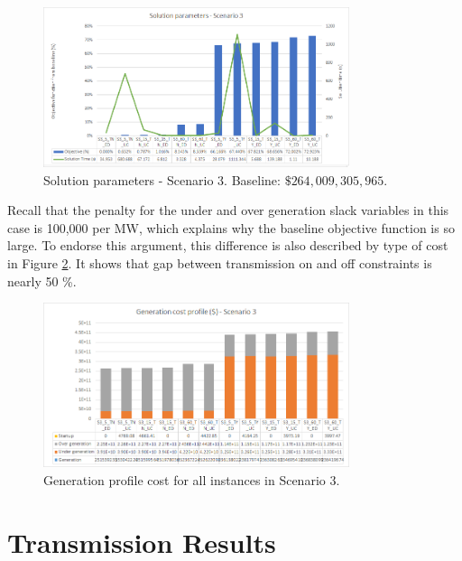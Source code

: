 \documentclass[12pt,LUDisStyle,twosided]{book}
\begin{document}
\begin{figure}[H] 
  \centering
	  \includegraphics[width=0.8\textwidth,height=\textheight,keepaspectratio]{SolutionParametersS3.png}
  \caption{Solution parameters - Scenario 3. Baseline: $\$264,009,305,965$.}
  \label{fig:solutionparameterss3}
\end{figure}

Recall that the penalty for the under and over generation slack variables in this case is 100,000 per MW, which explains why the baseline objective function is so large. To endorse this argument, this difference is also described by type of cost in Figure \ref{fig:genprofileS3}. It shows that gap between transmission on and off 
constraints is nearly 50 \%.

\begin{figure}[H] 
  \centering
  
	  \includegraphics[width=0.8\textwidth,keepaspectratio]{genprofileS3.png}
  
  \caption{Generation profile cost for all instances in Scenario 3.}
  \label{fig:genprofileS3}
\end{figure}

\newpage

\section{Transmission Results}
\end{document}
